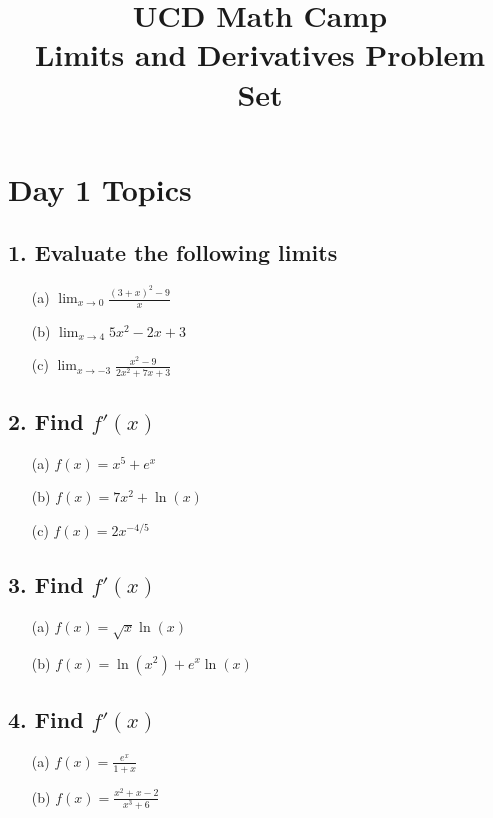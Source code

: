 \documentclass{article}
\title{UCD Math Camp\\Limits and Derivatives Problem Set}
\author{}
\date{}
\begin{document}
\maketitle

\section*{Day 1 Topics}

\subsection*{1. Evaluate the following limits}

\begin{itemize}
    \item[(a)] \(\lim_{x \to 0} \frac{(3 + x)^2 - 9}{x}\)
    \item[(b)] \(\lim_{x \to 4} 5x^2 - 2x + 3\)
    \item[(c)] \(\lim_{x \to -3} \frac{x^2 - 9}{2x^2 + 7x + 3}\)
\end{itemize}

\subsection*{2. Find \( f'(x) \)}

\begin{itemize}
    \item[(a)] \( f(x) = x^5 + e^x \)
    \item[(b)] \( f(x) = 7x^2 + \ln(x) \)
    \item[(c)] \( f(x) = 2x^{-4/5} \)
\end{itemize}

\subsection*{3. Find \( f'(x) \)}

\begin{itemize}
    \item[(a)] \( f(x) = \sqrt{x} \ln(x) \)
    \item[(b)] \( f(x) = \ln(x^2) + e^x \ln(x) \)
\end{itemize}

\subsection*{4. Find \( f'(x) \)}

\begin{itemize}
    \item[(a)] \( f(x) = \frac{e^x}{1 + x} \)
    \item[(b)] \( f(x) = \frac{x^2 + x - 2}{x^3 + 6} \)
\end{itemize}
\end{document}
